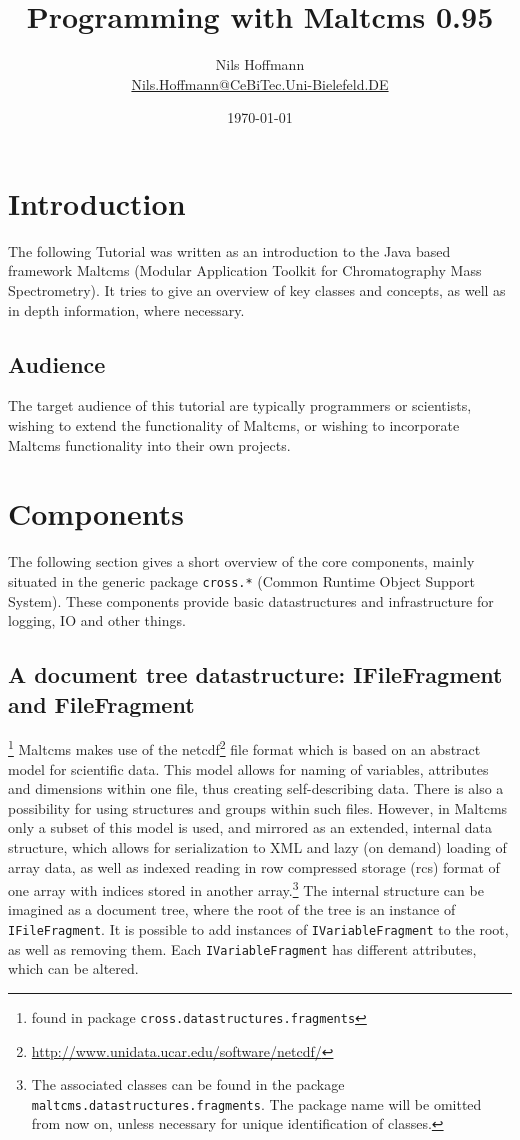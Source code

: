 \documentclass[a4paper,10pt]{article}
\author{Nils Hoffmann \\\url{Nils.Hoffmann@CeBiTec.Uni-Bielefeld.DE}}
\title{Programming with Maltcms 0.95}
\date{\today}
\begin{document}
\maketitle
\tableofcontents

\section{Introduction}
The following Tutorial was written as an introduction to the Java based framework Maltcms (Modular Application Toolkit for
Chromatography Mass Spectrometry). It tries to give an overview of key classes and concepts,
as well as in depth information, where necessary.
\subsection{Audience}
The target audience of this tutorial are typically programmers or scientists, wishing to 
extend the functionality of Maltcms, or wishing to incorporate Maltcms
functionality into their own projects.
\section{Components}
The following section gives a short overview of the core components, mainly
situated in the generic package \texttt{cross.*} (Common Runtime Object Support
System). These components provide basic datastructures and infrastructure for
logging, IO and other things.
\subsection{A document tree datastructure: IFileFragment and
FileFragment}\footnote{found in package \texttt{cross.datastructures.fragments}}
Maltcms makes use of the netcdf\footnote{\url{http://www.unidata.ucar.edu/software/netcdf/}} file format which is based on an abstract model for scientific data. This model allows for naming of variables, attributes and 
dimensions within one file, thus creating self-describing data. There is also a possibility for 
using structures and groups within such files. However, in Maltcms only a subset of this model is used, and mirrored
as an extended, internal data structure, which allows for serialization to XML
and lazy (on demand) loading of array data, as well as indexed reading in row
compressed storage (rcs) format of one array with indices stored in another array.\footnote{The associated classes can be found in the package \texttt{maltcms.datastructures.fragments}. The package name will be omitted from now on, unless necessary for unique identification of classes.} The internal structure can be imagined as a document tree, where the root of the tree is an instance of \texttt{IFileFragment}. It is possible to add instances of \texttt{IVariableFragment} to the root, as well as removing them. Each \texttt{IVariableFragment} has different attributes, which can be altered.
\end{document}
